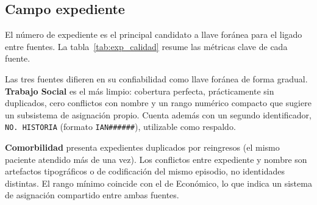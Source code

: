 \subsection{Campo expediente}

El número de expediente es el principal candidato a llave foránea para el ligado entre fuentes. La tabla~\ref{tab:exp_calidad} resume las métricas clave de cada fuente.

\begin{table}[H]
\centering
\caption{Calidad del identificador de expediente por fuente}
\label{tab:exp_calidad}
\small
{}
\end{table}

Las tres fuentes difieren en su confiabilidad como llave foránea de forma gradual. \textbf{Trabajo Social} es el más limpio: cobertura perfecta, prácticamente sin duplicados, cero conflictos con nombre y un rango numérico compacto que sugiere un subsistema de asignación propio. Cuenta además con un segundo identificador, \texttt{NO. HISTORIA} (formato \texttt{IAN\#\#\#\#\#\#}), utilizable como respaldo.

\textbf{Comorbilidad} presenta expedientes duplicados por reingresos (el mismo paciente atendido más de una vez). Los conflictos entre expediente y nombre son artefactos tipográficos o de codificación del mismo episodio, no identidades distintas. El rango mínimo coincide con el de Económico, lo que indica un sistema de asignación compartido entre ambas fuentes.

